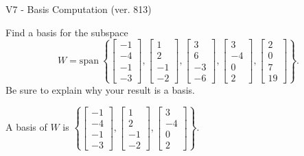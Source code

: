 \begin{exercise}
  \begin{exerciseTitle}V7 - Basis Computation (ver. 813)\end{exerciseTitle}
  \begin{exerciseStatement}
    Find a basis for the subspace 
\[W=\mathrm{span}\ \left\{\left[\begin{array}{r}
-1 \\
-4 \\
-1 \\
-3
\end{array}\right] , \left[\begin{array}{r}
1 \\
2 \\
-1 \\
-2
\end{array}\right] , \left[\begin{array}{r}
3 \\
6 \\
-3 \\
-6
\end{array}\right] , \left[\begin{array}{r}
3 \\
-4 \\
0 \\
2
\end{array}\right] , \left[\begin{array}{r}
2 \\
0 \\
7 \\
19
\end{array}\right]\right\}.\]
 Be sure to explain why your result is a basis.


  \end{exerciseStatement}
  \begin{exerciseAnswer}
   A basis of \(W\) is  \(\left\{\left[\begin{array}{r}
-1 \\
-4 \\
-1 \\
-3
\end{array}\right] , \left[\begin{array}{r}
1 \\
2 \\
-1 \\
-2
\end{array}\right] , \left[\begin{array}{r}
3 \\
-4 \\
0 \\
2
\end{array}\right]\right\}\).
  


  \end{exerciseAnswer}
\end{exercise}